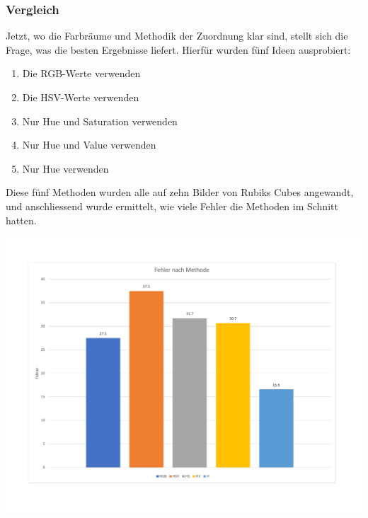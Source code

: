 \documentclass[a4paper, 12pt]{article}
\begin{document}
\subsubsection{Vergleich}
Jetzt, wo die Farbräume und Methodik der Zuordnung klar sind, stellt sich die Frage, was die besten Ergebnisse liefert. Hierfür wurden fünf Ideen ausprobiert:
\begin{enumerate}
  \item Die RGB-Werte verwenden
  \item Die HSV-Werte verwenden
  \item Nur Hue und Saturation verwenden
  \item Nur Hue und Value verwenden
  \item Nur Hue verwenden
\end{enumerate}
Diese fünf Methoden wurden alle auf zehn Bilder von Rubiks Cubes angewandt, und anschliessend wurde ermittelt, wie viele Fehler die Methoden im Schnitt hatten. 

\includegraphics[scale=0.4]{Fehler_nach_Methode}
\end{document}
